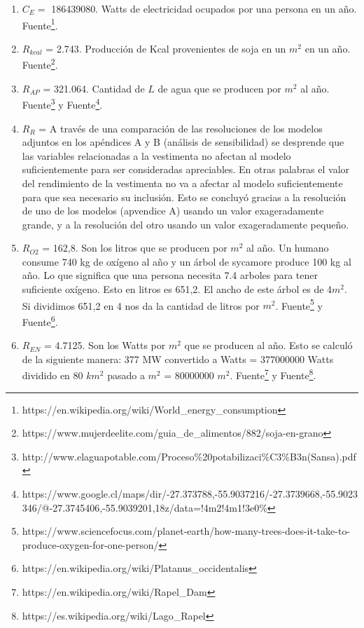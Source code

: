 \documentclass[12pt]{report}
\begin{document}
\begin{enumerate}
    \item $C_{E} =$ 186439080. Watts de electricidad ocupados por una persona en un a\~no. Fuente\footnote{https://en.wikipedia.org/wiki/World\_energy\_consumption}. 
  
    \item $R_{kcal}$ = 2.743. Producci\'on de Kcal provenientes de soja en un $m^{2}$ en un a\~no. Fuente\footnote{https://www.mujerdeelite.com/guia_de_alimentos/882/soja-en-grano}.
  
   \item $R_{AP}$ = 321.064. Cantidad de $L$ de agua que se producen por $m^{2}$ al a\~no. Fuente\footnote{http://www.elaguapotable.com/Proceso\%20potabilizaci\%C3\%B3n(Sansa).pdf} y Fuente\footnote{https://www.google.cl/maps/dir/-27.373788,-55.9037216/-27.3739668,-55.9023346/@-27.3745406,-55.9039201,18z/data=!4m2!4m1!3e0\%}. 
  
    \item $R_{R}$ = A trav\'es de una comparaci\'on de las resoluciones de los modelos adjuntos en los ap\'endices A y B (an\'alisis de sensibilidad) se desprende que las variables relacionadas a la vestimenta no afectan al modelo suficientemente para ser consideradas apreciables. En otras palabras el valor del rendimiento de la vestimenta no va a afectar al modelo suficientemente para que sea necesario su inclusi\'on. Esto se concluy\'o gracias a la resoluci\'on de uno de los modelos (apvendice A) usando un valor exageradamente grande, y a la resoluci\'on del otro usando un valor exageradamente peque\~no.  
  
    \item $R_{O2}$ = 162,8. Son los litros que se producen por $m^{2}$ al a\~no. Un humano consume 740 kg de ox\'igeno al a\~no y un \'arbol de sycamore produce 100 kg al a\~no. Lo que significa que una persona necesita 7.4 arboles para tener suficiente ox\'igeno. Esto en litros es 651,2. El ancho de este \'arbol es de 4$m^{2}$. Si dividimos 651,2 en 4 nos da la cantidad de litros por $m^{2}$. Fuente\footnote{https://www.sciencefocus.com/planet-earth/how-many-trees-does-it-take-to-produce-oxygen-for-one-person/} y Fuente\footnote{https://en.wikipedia.org/wiki/Platanus\_occidentalis}.  
    
    \item $R_{EN}$ = 4.7125. Son los Watts por $m^{2}$ que se producen al a\~no. Esto se calcul\'o de la siguiente manera: 377 MW convertido a Watts = 377000000 Watts dividido en 80 $km^{2}$ pasado a $m^{2}$ = 80000000 $m^{2}$. Fuente\footnote{https://en.wikipedia.org/wiki/Rapel_Dam} y Fuente\footnote{https://es.wikipedia.org/wiki/Lago\_Rapel}.
    
\end{enumerate}
\newpage
\end{document}
